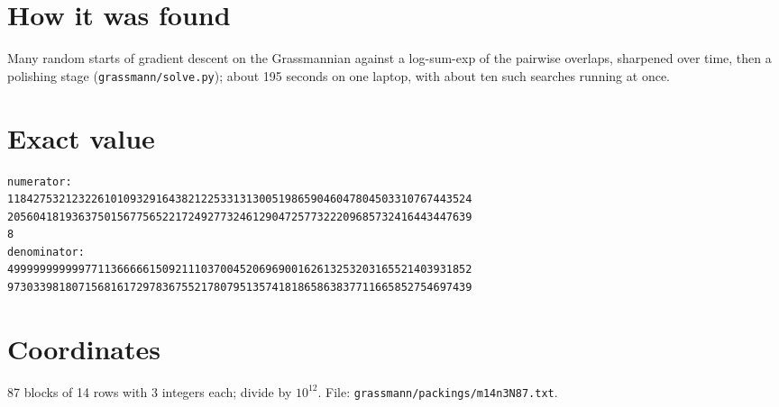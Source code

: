 \documentclass[11pt,a4paper]{article}
\begin{document}
\section{How it was found}
Many random starts of gradient descent on the Grassmannian against a log-sum-exp of the pairwise overlaps, sharpened over time, then a polishing stage (\texttt{grassmann/solve.py}); about 195 seconds on one laptop, with about ten such searches running at once.


\appendix
\section{Exact value}
{\small
\begin{verbatim}
numerator:
118427532123226101093291643821225331313005198659046047804503310767443524
205604181936375015677565221724927732461290472577322209685732416443447639
8
denominator:
499999999999771136666615092111037004520696900162613253203165521403931852
973033981807156816172978367552178079513574181865863837711665852754697439
\end{verbatim}}

\section{Coordinates}
87 blocks of 14 rows with 3 integers each; divide by $10^{12}$. File: \texttt{grassmann/packings/m14n3N87.txt}.
{\tiny
\begin{multicols}{3}
\end{multicols}}
\end{document}
